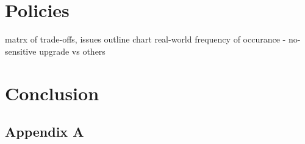 \documentclass[12pt,fleqn]{ucithesis}
\begin{document}
\preliminarypages









\chapter{Policies}
  matrx of trade-offs, issues
  outline chart
  real-world frequency of occurance
  - no-sensitive upgrade vs others
\chapter{Conclusion}

\clearpage
{}




\appendix
\section{Appendix A}
\end{document}
